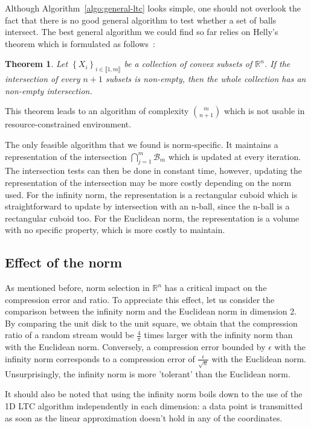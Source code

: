 \documentclass[10pt, conference, compsocconf]{IEEEtran}
\newcommand{\todo}[1]{\marginpar{\parbox{18mm}{\flushleft\tiny\color{red}\textbf{TODO}:
      #1}}}
\newtheorem*{theorem}{Theorem}
\begin{document}
Although Algorithm~\ref{algo:general-ltc} looks simple, one should not
overlook the fact that there is no good general algorithm to test
whether a set of balls intersect. The best general algorithm we could find
so far relies on Helly's theorem which is formulated as follows~\cite{helly1923mengen}:
\begin{theorem}
Let $\left\{ X_i \right\}_{i \in \llbracket 1, m \rrbracket}$ be a collection of convex subsets of $\mathbb{R}^n$. If the intersection of every $n+1$
subsets is non-empty, then the whole collection has an non-empty intersection.
\end{theorem}
This theorem leads to an algorithm of complexity ${m \choose n+1}$ which is
not usable in resource-constrained environment.

The only feasible algorithm that we found is norm-specific. It
maintains a representation of the intersection
$\bigcap_{j=1}^{m}{\mathcal{B}_m}$ which is updated at every iteration.
The intersection tests can then be done in constant time, however,
updating the representation of the intersection may be more costly
depending on the norm used. For the infinity norm, the representation
is a rectangular cuboid which is straightforward to update by
intersection with an n-ball, since the n-ball is a rectangular cuboid too.
For the Euclidean norm, the representation is a volume with no specific property,
which is more costly to maintain.

\subsection{Effect of the norm}

As mentioned before, norm selection in $\mathbb{R}^n$ has a critical
impact on the compression error and ratio. To appreciate this effect,
let us consider the comparison between the infinity norm and the
Euclidean norm in dimension 2. By comparing the unit disk to the unit
square, we obtain that the compression ratio of a random stream would
be $\frac{4}{\pi}$ times larger with the infinity norm than with the
Euclidean norm. Conversely, a compression error bounded by $\epsilon$
with the infinity norm corresponds to a compression error of
$\frac{\epsilon}{\sqrt{n}}$ with the Euclidean norm. Unsurprisingly, the
infinity norm is more 'tolerant' than the Euclidean norm.

\todo{Perhaps add a figure}

It should also be noted that using the infinity norm boils down to the
use of the 1D LTC algorithm independently in each dimension: a data
point is transmitted as soon as the linear approximation doesn't hold
in any of the coordinates. \todo{This is unclear}
\end{document}
